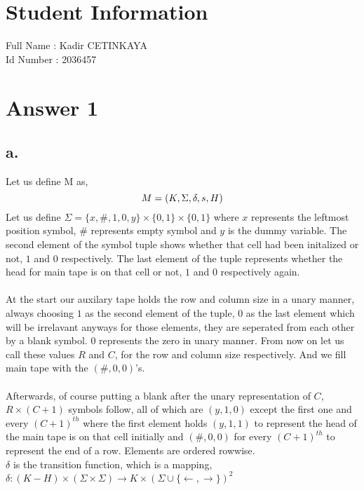 \documentclass[12pt]{article}
\begin{document}
\section*{Student Information } 
Full Name :  Kadir CETINKAYA\\
Id Number :  2036457 \\

\section*{Answer 1}

\subsection*{a.}
Let us define M as,
$$M=(K,\Sigma , \delta , s, H)\\$$
Let us define $\Sigma=\{x,\#,1,0,y\}\times\{0,1\}\times\{0,1\}$ where $x$ represents the
leftmost position symbol, $\#$ represents empty symbol and $y$ is the dummy
variable. The second element of the symbol tuple shows whether that cell 
had been initalized or not, $1$ and $0$ respectively. The last element
of the tuple represents whether the head for main tape is on that cell
or not, $1$ and $0$ respectively again.\\
\\
At the start our auxilary tape holds the row and column size in a unary
manner, always choosing $1$ as the second element of the tuple, $0$ as the last
element which will be irrelavant anyways for those elements, they are seperated from each other
by a blank symbol. $0$ represents the zero in unary manner. From now on
let us call these values $R$ and $C$, for the row and column size respectively.
And we fill main tape with the $(\#,0,0)$'s.\\
\\
Afterwards, of course putting a blank after the unary representation of $C$,
$R\times (C+1)$ symbols follow, all of which are $(y,1,0)$ except the first one
and every $(C+1)^{th}$ where the first element holds $(y,1,1)$ to represent the
head of the main tape is on that cell initially and $(\#,0,0)$ for every $(C+1)^{th}$
to represent the end of a row. Elements are ordered rowwise.
\\
$\delta$ is the transition function, which is a mapping,
$\delta: (K-H)\times(\Sigma\times\Sigma)\rightarrow K\times(\Sigma\cup\{\leftarrow,\rightarrow\})^2$\\
\end{document}
